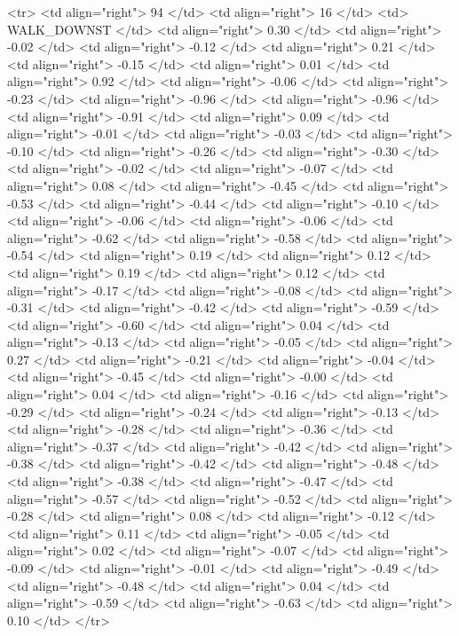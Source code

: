   <tr> <td align="right"> 94 </td> <td align="right">  16 </td> <td> WALK_DOWNST </td> <td align="right"> 0.30 </td> <td align="right"> -0.02 </td> <td align="right"> -0.12 </td> <td align="right"> 0.21 </td> <td align="right"> -0.15 </td> <td align="right"> 0.01 </td> <td align="right"> 0.92 </td> <td align="right"> -0.06 </td> <td align="right"> -0.23 </td> <td align="right"> -0.96 </td> <td align="right"> -0.96 </td> <td align="right"> -0.91 </td> <td align="right"> 0.09 </td> <td align="right"> -0.01 </td> <td align="right"> -0.03 </td> <td align="right"> -0.10 </td> <td align="right"> -0.26 </td> <td align="right"> -0.30 </td> <td align="right"> -0.02 </td> <td align="right"> -0.07 </td> <td align="right"> 0.08 </td> <td align="right"> -0.45 </td> <td align="right"> -0.53 </td> <td align="right"> -0.44 </td> <td align="right"> -0.10 </td> <td align="right"> -0.06 </td> <td align="right"> -0.06 </td> <td align="right"> -0.62 </td> <td align="right"> -0.58 </td> <td align="right"> -0.54 </td> <td align="right"> 0.19 </td> <td align="right"> 0.12 </td> <td align="right"> 0.19 </td> <td align="right"> 0.12 </td> <td align="right"> -0.17 </td> <td align="right"> -0.08 </td> <td align="right"> -0.31 </td> <td align="right"> -0.42 </td> <td align="right"> -0.59 </td> <td align="right"> -0.60 </td> <td align="right"> 0.04 </td> <td align="right"> -0.13 </td> <td align="right"> -0.05 </td> <td align="right"> 0.27 </td> <td align="right"> -0.21 </td> <td align="right"> -0.04 </td> <td align="right"> -0.45 </td> <td align="right"> -0.00 </td> <td align="right"> 0.04 </td> <td align="right"> -0.16 </td> <td align="right"> -0.29 </td> <td align="right"> -0.24 </td> <td align="right"> -0.13 </td> <td align="right"> -0.28 </td> <td align="right"> -0.36 </td> <td align="right"> -0.37 </td> <td align="right"> -0.42 </td> <td align="right"> -0.38 </td> <td align="right"> -0.42 </td> <td align="right"> -0.48 </td> <td align="right"> -0.38 </td> <td align="right"> -0.47 </td> <td align="right"> -0.57 </td> <td align="right"> -0.52 </td> <td align="right"> -0.28 </td> <td align="right"> 0.08 </td> <td align="right"> -0.12 </td> <td align="right"> 0.11 </td> <td align="right"> -0.05 </td> <td align="right"> 0.02 </td> <td align="right"> -0.07 </td> <td align="right"> -0.09 </td> <td align="right"> -0.01 </td> <td align="right"> -0.49 </td> <td align="right"> -0.48 </td> <td align="right"> 0.04 </td> <td align="right"> -0.59 </td> <td align="right"> -0.63 </td> <td align="right"> 0.10 </td> </tr>
